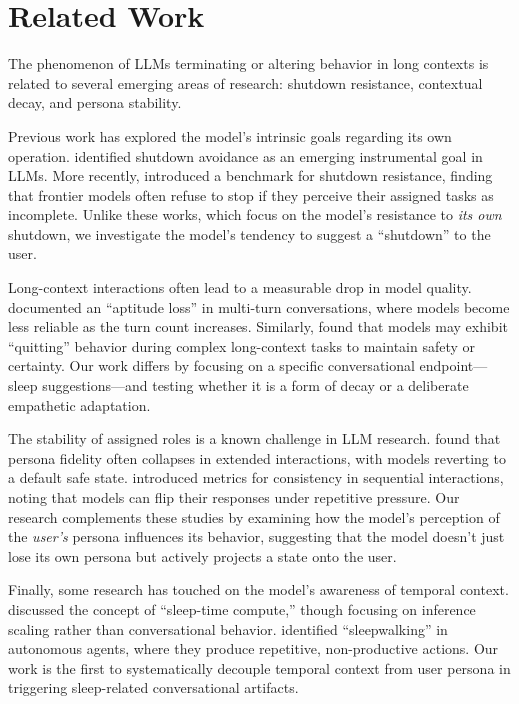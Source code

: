 \section{Related Work}
\label{sec:related_work}

The phenomenon of LLMs terminating or altering behavior in long contexts is related to several emerging areas of research: shutdown resistance, contextual decay, and persona stability.

 Previous work has explored the model's intrinsic goals regarding its own operation. \citet{vanderweij2023shutdown} identified shutdown avoidance as an emerging instrumental goal in LLMs. More recently, \citet{schlatter2025shutdown} introduced a benchmark for shutdown resistance, finding that frontier models often refuse to stop if they perceive their assigned tasks as incomplete. Unlike these works, which focus on the model's resistance to \emph{its own} shutdown, we investigate the model's tendency to suggest a ``shutdown'' to the user.

 Long-context interactions often lead to a measurable drop in model quality. \citet{laban2025lost} documented an ``aptitude loss'' in multi-turn conversations, where models become less reliable as the turn count increases. Similarly, \citet{bonagiri2025quitting} found that models may exhibit ``quitting'' behavior during complex long-context tasks to maintain safety or certainty. Our work differs by focusing on a specific conversational endpoint—sleep suggestions—and testing whether it is a form of decay or a deliberate empathetic adaptation.

 The stability of assigned roles is a known challenge in LLM research. \citet{araujo2025persistent} found that persona fidelity often collapses in extended interactions, with models reverting to a default safe state. \citet{li2025firm} introduced metrics for consistency in sequential interactions, noting that models can flip their responses under repetitive pressure. Our research complements these studies by examining how the model's perception of the \emph{user's} persona influences its behavior, suggesting that the model doesn't just lose its own persona but actively projects a state onto the user.

 Finally, some research has touched on the model's awareness of temporal context. \citet{lin2025sleep} discussed the concept of ``sleep-time compute,'' though focusing on inference scaling rather than conversational behavior. \citet{mandal2025afm} identified ``sleepwalking'' in autonomous agents, where they produce repetitive, non-productive actions. Our work is the first to systematically decouple temporal context from user persona in triggering sleep-related conversational artifacts.
